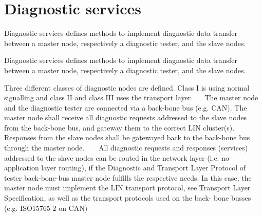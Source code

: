 \hypertarget{group__diagnostic__group}{}\section{Diagnostic services}
\label{group__diagnostic__group}


Diagnostic services defines methods to implement diagnostic data transfer between a master node, respectively a diagnostic tester, and the slave nodes.  


Diagnostic services defines methods to implement diagnostic data transfer between a master node, respectively a diagnostic tester, and the slave nodes. 

Three different classes of diagnostic nodes are defined. Class I is using normal signalling and class I\+I and class I\+I\+I uses the transport layer.~\newline
~\newline
 The master node and the diagnostic tester are connected via a back-\/bone bus (e.\+g. C\+A\+N). The master node shall receive all diagnostic requests addressed to the slave nodes from the back-\/bone bus, and gateway them to the correct L\+I\+N cluster(s). Responses from the slave nodes shall be gatewayed back to the back-\/bone bus through the master node. ~\newline
~\newline
 All diagnostic requests and responses (services) addressed to the slave nodes can be routed in the network layer (i.\+e. no application layer routing), if the Diagnostic and Transport Layer Protocol of tester back-\/bone-\/bus master node fulfills the respective needs. In this case, the master node must implement the L\+I\+N transport protocol, see Transport Layer Specification, as well as the transport protocols used on the back-\/ bone busses (e.\+g. I\+S\+O15765-\/2 on C\+A\+N) 